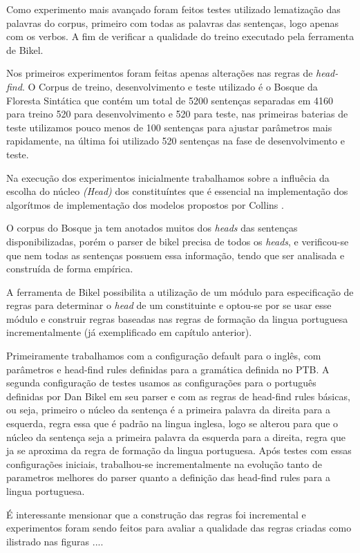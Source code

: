 Como experimento mais avançado foram feitos testes utilizado lematização das palavras do corpus, primeiro com todas as palavras das sentenças, logo apenas com os verbos. A fim de verificar a qualidade do treino executado pela ferramenta de Bikel.

Nos primeiros experimentos foram feitas apenas alterações nas regras de \emph{head-find}. O Corpus de treino, desenvolvimento e teste utilizado é o Bosque da Floresta Sintática que contém um total de 5200 sentenças separadas em 4160 para treino 520 para desenvolvimento e 520 para teste, nas primeiras baterias de teste utilizamos pouco menos de 100 sentenças para ajustar parâmetros mais rapidamente, na última foi utilizado 520 sentenças na fase de desenvolvimento e teste.

Na execução dos experimentos inicialmente trabalhamos sobre a influêcia da escolha do núcleo \emph{(Head)} dos constituíntes que é essencial na implementação dos algorítmos de implementação dos modelos propostos por Collins \cite{collins99}.

O corpus do Bosque ja tem anotados muitos dos \emph{heads} das sentenças disponibilizadas, porém o parser de bikel precisa de todos os \emph{heads}, e verificou-se que nem todas as sentenças possuem essa informação, tendo que ser analisada e construída de forma empírica.

A ferramenta de Bikel possibilita a utilização de um módulo para especificação de regras para determinar o \emph{head} de um constituinte e optou-se por se usar esse módulo e construir regras baseadas nas regras de formação da lingua portuguesa incrementalmente (já exemplificado em capítulo anterior). 

Primeiramente trabalhamos com a configuração default para o inglês, com parâmetros e head-find rules definidas para a gramática definida no PTB. A segunda configuração de testes usamos as configurações para o português definidas por Dan Bikel em seu parser e com as regras de head-find rules básicas, ou seja, primeiro o núcleo da sentença é a primeira palavra da direita para a esquerda, regra essa que é padrão na lingua inglesa, logo se alterou para que o núcleo da sentença seja a primeira palavra da esquerda para a direita, regra que ja se aproxima da regra de formação da lingua portuguesa. Após testes com essas configurações iniciais, trabalhou-se incrementalmente na evolução tanto de parametros melhores do parser quanto a definição das head-find rules para a lingua portuguesa.

É interessante mensionar que a construção das regras foi incremental e experimentos foram sendo feitos para avaliar a qualidade das regras criadas como ilistrado nas figuras ....

